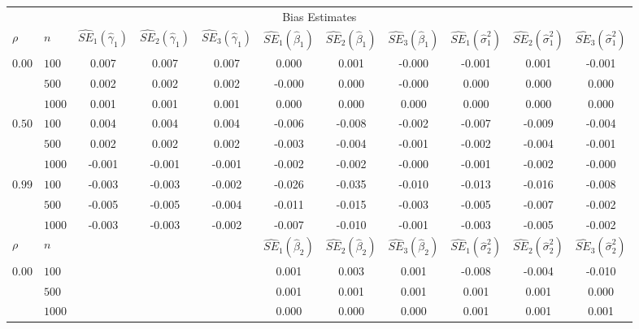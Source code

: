 \documentclass[10pt]{article}
\begin{document}
\begin{table}[ht]
\begin{center}
\begin{tabular}{llccccccccc}
   \hline \multicolumn{11}{c}{Bias Estimates}\\ $\rho$ & $n$ & $\widehat{SE}_1(\widehat{\gamma}_1)$ & $\widehat{SE}_2(\widehat{\gamma}_1)$ & $\widehat{SE}_3(\widehat{\gamma}_1)$ & $\widehat{SE}_1(\widehat{\beta}_1)$ & $\widehat{SE}_2(\widehat{\beta}_1)$ & $\widehat{SE}_3(\widehat{\beta}_1)$ & $\widehat{SE}_1(\widehat{\sigma}^2_1)$ & $\widehat{SE}_2(\widehat{\sigma}^2_1)$ & $\widehat{SE}_3(\widehat{\sigma}^2_1)$ \\ 
   \hline$0.00$ & $100$ & 0.007 & 0.007 & 0.007 & 0.000 & 0.001 & -0.000 & -0.001 & 0.001 & -0.001 \\ 
    & $500$ & 0.002 & 0.002 & 0.002 & -0.000 & 0.000 & -0.000 & 0.000 & 0.000 & 0.000 \\ 
    & $1000$ & 0.001 & 0.001 & 0.001 & 0.000 & 0.000 & 0.000 & 0.000 & 0.000 & 0.000 \\ 
  $0.50$ & $100$ & 0.004 & 0.004 & 0.004 & -0.006 & -0.008 & -0.002 & -0.007 & -0.009 & -0.004 \\ 
    & $500$ & 0.002 & 0.002 & 0.002 & -0.003 & -0.004 & -0.001 & -0.002 & -0.004 & -0.001 \\ 
    & $1000$ & -0.001 & -0.001 & -0.001 & -0.002 & -0.002 & -0.000 & -0.001 & -0.002 & -0.000 \\ 
  $0.99$ & $100$ & -0.003 & -0.003 & -0.002 & -0.026 & -0.035 & -0.010 & -0.013 & -0.016 & -0.008 \\ 
    & $500$ & -0.005 & -0.005 & -0.004 & -0.011 & -0.015 & -0.003 & -0.005 & -0.007 & -0.002 \\ 
    & $1000$ & -0.003 & -0.003 & -0.002 & -0.007 & -0.010 & -0.001 & -0.003 & -0.005 & -0.002 \\ 
   \hline$\rho$ & $n$ &   &   &   & $\widehat{SE}_1(\widehat{\beta}_2)$ & $\widehat{SE}_2(\widehat{\beta}_2)$ & $\widehat{SE}_3(\widehat{\beta}_2)$ & $\widehat{SE}_1(\widehat{\sigma}^2_2)$ & $\widehat{SE}_2(\widehat{\sigma}^2_2)$ & $\widehat{SE}_3(\widehat{\sigma}^2_2)$ \\ 
   \hline$0.00$ & $100$ &   &   &   & 0.001 & 0.003 & 0.001 & -0.008 & -0.004 & -0.010 \\ 
    & $500$ &   &   &   & 0.001 & 0.001 & 0.001 & 0.001 & 0.001 & 0.000 \\ 
    & $1000$ &   &   &   & 0.000 & 0.000 & 0.000 & 0.001 & 0.001 & 0.001 \\ 

\end{tabular}
\end{center}
\end{table}
\end{document}

